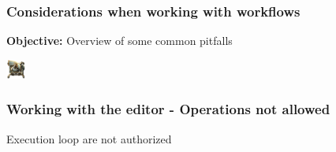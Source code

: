 \begin{frame}
    \frametitle{
        \huge
        Considerations when working with workflows
        \vspace{1em}
    }
    \textbf{Objective:} Overview of some common pitfalls
    \begin{center}
        \includegraphics[width=24px]{pictures/radar.png}
    \end{center}
\end{frame}

\begin{frame}
    \frametitle{Working with the editor - Operations not allowed}
    Execution loop are not authorized
    \vspace*{1em}
    \begin{columns}
        \begin{column}{0.7\textwidth}
        \end{column}
        \begin{column}{0.3\textwidth}
        \end{column}
    \end{columns}
\end{frame}

